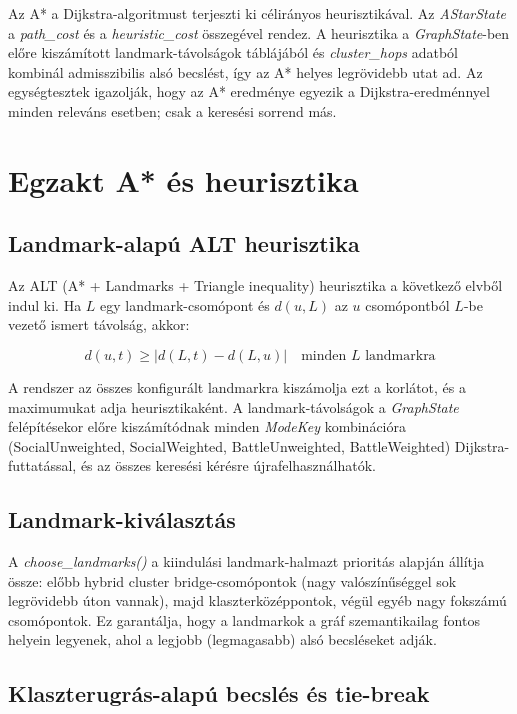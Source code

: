 Az A* \cite{hart1968} a Dijkstra-algoritmust terjeszti ki célirányos heurisztikával. Az \textit{AStarState} a \textit{path\_cost} és a \textit{heuristic\_cost} összegével rendez. A heurisztika a \textit{GraphState}-ben előre kiszámított landmark-távolságok táblájából és \textit{cluster\_hops} adatból kombinál admisszibilis alsó becslést, így az A* helyes legrövidebb utat ad. Az egységtesztek igazolják, hogy az A* eredménye egyezik a Dijkstra-eredménnyel minden releváns esetben; csak a keresési sorrend más.

\section{Egzakt A* és heurisztika}

\subsection{Landmark-alapú ALT heurisztika}

Az ALT (A* + Landmarks + Triangle inequality) heurisztika \cite{goldberg2005} a következő elvből indul ki. Ha $L$ egy landmark-csomópont és $d(u, L)$ az $u$ csomópontból $L$-be vezető ismert távolság, akkor:

\begin{equation}
d(u, t) \geq |d(L, t) - d(L, u)| \quad \text{minden } L \text{ landmarkra}
\end{equation}

A rendszer az összes konfigurált landmarkra kiszámolja ezt a korlátot, és a maximumukat adja heurisztikaként. A landmark-távolságok a \textit{GraphState} felépítésekor előre kiszámítódnak minden \textit{ModeKey} kombinációra (SocialUnweighted, SocialWeighted, BattleUnweighted, BattleWeighted) Dijkstra-futtatással, és az összes keresési kérésre újrafelhasználhatók.

\subsection{Landmark-kiválasztás}

A \textit{choose\_landmarks()} a kiindulási landmark-halmazt prioritás alapján állítja össze: előbb hybrid cluster bridge-csomópontok (nagy valószínűséggel sok legrövidebb úton vannak), majd klaszterközéppontok, végül egyéb nagy fokszámú csomópontok. Ez garantálja, hogy a landmarkok a gráf szemantikailag fontos helyein legyenek, ahol a legjobb (legmagasabb) alsó becsléseket adják.

\subsection{Klaszterugrás-alapú becslés és tie-break}

